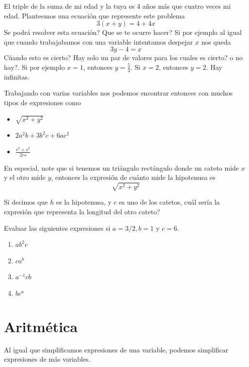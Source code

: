 \begin{ejemplo}
	El triple de la suma de mi edad y la tuya es 4 años más que cuatro veces mi edad. Planteemos una ecuación que represente este problema\\
	\[3(x+y)=4+4x\]
	Se podrá resolver esta ecuación? Que se te ocurre hacer? Si por ejemplo al igual que cuando trabajabamos con una variable intentamos despejar $x$ nos queda
	\[3y-4=x\]
	Cúando esto es cierto? Hay solo un par de valores para los cuales es cierto? o no hay?. Si por ejemplo $x=1$, entonces $y=\frac{5}{3}$. Si $x=2$, entonces $y=2$. Hay infinitas.
\end{ejemplo}

Trabajando con varias variables nos podemos encontrar entonces con muchos tipos de expresiones como

\begin{multicols}{3}
	\begin{itemize}
		\item $\sqrt{x^2+y^2}$
		\item $2a^2b + 3b^2c + 6ac^2$
		\item $\frac{r^2+s^2}{2rs}$
	\end{itemize}
\end{multicols}

\begin{ejemplo}
	En especial, note que si tenemos un triángulo rectángulo donde un cateto mide $x$ y el otro mide $y$, entonces la expresión de cuánto mide la hipotenusa es
	\[ \sqrt{x^2+y^2} \]
\end{ejemplo}

\begin{exer}
	Si decimos que $h$ es la hipotenusa, y $c$ es uno de los catetos, cuál sería la expresión que representa la longitud del otro cateto?
\end{exer}

\begin{exer}
	Evaluar las siguientes expresiones si $a=3/2,b=1$ y $c=6$.
	\begin{multicols}{2}
		\begin{enumerate}
			\item $ab^2c$
			\item $ca^b$
			\item $a^{-1}cb$
			\item $bc^a$
		\end{enumerate}
	\end{multicols}
\end{exer}

\section{Aritmética}\label{capitulo_aritmetica_con_varias_variables}
Al igual que simplificamos expresiones de una variable, podemos simplificar expresiones de más variables.

